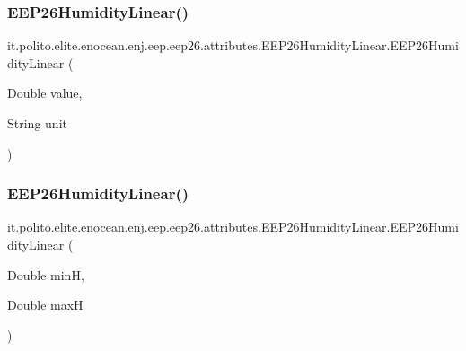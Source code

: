 \subsubsection{\texorpdfstring{E\+E\+P26\+Humidity\+Linear()}{EEP26HumidityLinear()}\hspace{0.1cm}{\footnotesize\ttfamily [2/3]}}
{\footnotesize\ttfamily it.\+polito.\+elite.\+enocean.\+enj.\+eep.\+eep26.\+attributes.\+E\+E\+P26\+Humidity\+Linear.\+E\+E\+P26\+Humidity\+Linear (\begin{DoxyParamCaption}\item[{Double}]{value,  }\item[{String}]{unit }\end{DoxyParamCaption})}

\hypertarget{classit_1_1polito_1_1elite_1_1enocean_1_1enj_1_1eep_1_1eep26_1_1attributes_1_1_e_e_p26_humidity_linear_a167e2b9c1c1d7848246bdc7e3f520bb4}{}\label{classit_1_1polito_1_1elite_1_1enocean_1_1enj_1_1eep_1_1eep26_1_1attributes_1_1_e_e_p26_humidity_linear_a167e2b9c1c1d7848246bdc7e3f520bb4} 
\subsubsection{\texorpdfstring{E\+E\+P26\+Humidity\+Linear()}{EEP26HumidityLinear()}\hspace{0.1cm}{\footnotesize\ttfamily [3/3]}}
{\footnotesize\ttfamily it.\+polito.\+elite.\+enocean.\+enj.\+eep.\+eep26.\+attributes.\+E\+E\+P26\+Humidity\+Linear.\+E\+E\+P26\+Humidity\+Linear (\begin{DoxyParamCaption}\item[{Double}]{minH,  }\item[{Double}]{maxH }\end{DoxyParamCaption})}



